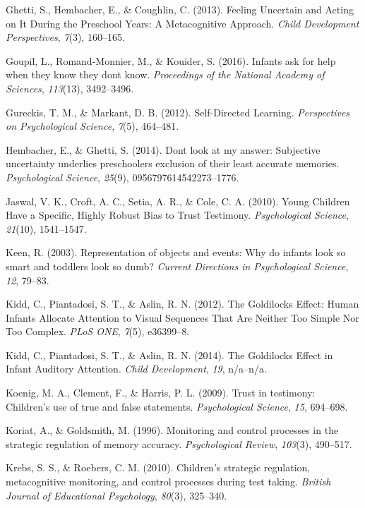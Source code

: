 \documentclass[english,man]{apa6}
\theoremstyle{definition}
\theoremstyle{definition}
\theoremstyle{definition}
\theoremstyle{remark}
\begin{document}
\hypertarget{ref-Ghetti2013}{}
Ghetti, S., Hembacher, E., \& Coughlin, C. (2013). Feeling Uncertain and
Acting on It During the Preschool Years: A Metacognitive Approach.
\emph{Child Development Perspectives}, \emph{7}(3), 160--165.

\hypertarget{ref-Goupil2016}{}
Goupil, L., Romand-Monnier, M., \& Kouider, S. (2016). Infants ask for
help when they know they dont know. \emph{Proceedings of the National
Academy of Sciences}, \emph{113}(13), 3492--3496.

\hypertarget{ref-Gureckis2012}{}
Gureckis, T. M., \& Markant, D. B. (2012). Self-Directed Learning.
\emph{Perspectives on Psychological Science}, \emph{7}(5), 464--481.

\hypertarget{ref-Hembacher2014}{}
Hembacher, E., \& Ghetti, S. (2014). Dont look at my answer: Subjective
uncertainty underlies preschoolers exclusion of their least accurate
memories. \emph{Psychological Science}, \emph{25}(9),
0956797614542273--1776.

\hypertarget{ref-Jaswal2010}{}
Jaswal, V. K., Croft, A. C., Setia, A. R., \& Cole, C. A. (2010). Young
Children Have a Specific, Highly Robust Bias to Trust Testimony.
\emph{Psychological Science}, \emph{21}(10), 1541--1547.

\hypertarget{ref-Keen2003}{}
Keen, R. (2003). Representation of objects and events: Why do infants
look so smart and toddlers look so dumb? \emph{Current Directions in
Psychological Science}, \emph{12}, 79--83.

\hypertarget{ref-Kidd2012}{}
Kidd, C., Piantadosi, S. T., \& Aslin, R. N. (2012). The Goldilocks
Effect: Human Infants Allocate Attention to Visual Sequences That Are
Neither Too Simple Nor Too Complex. \emph{PLoS ONE}, \emph{7}(5),
e36399--8.

\hypertarget{ref-Kidd2014}{}
Kidd, C., Piantadosi, S. T., \& Aslin, R. N. (2014). The Goldilocks
Effect in Infant Auditory Attention. \emph{Child Development},
\emph{19}, n/a--n/a.

\hypertarget{ref-Koenig2009}{}
Koenig, M. A., Clement, F., \& Harris, P. L. (2009). Trust in testimony:
Children's use of true and false statements. \emph{Psychological
Science}, \emph{15}, 694--698.

\hypertarget{ref-Koriat1996}{}
Koriat, A., \& Goldsmith, M. (1996). Monitoring and control processes in
the strategic regulation of memory accuracy. \emph{Psychological
Review}, \emph{103}(3), 490--517.

\hypertarget{ref-Krebs2010}{}
Krebs, S. S., \& Roebers, C. M. (2010). Children's strategic regulation,
metacognitive monitoring, and control processes during test taking.
\emph{British Journal of Educational Psychology}, \emph{80}(3),
325--340.
\end{document}
